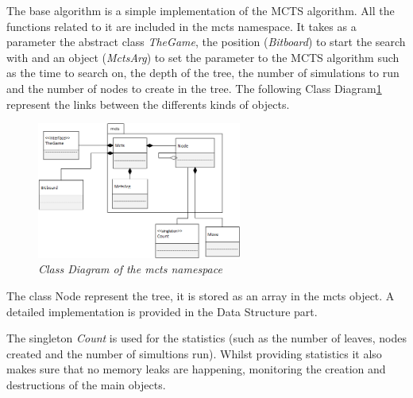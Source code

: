 The base algorithm is a simple implementation of the MCTS algorithm. All the functions related to it are included in the mcts namespace. It takes as a parameter the abstract class \textit{TheGame}, the position (\textit{Bitboard}) to start the search with and an object (\textit{MctsArg}) to set the parameter to the MCTS algorithm such as the time to search on, the depth of the tree, the number of simulations to run and the number of nodes to create in the tree.
The following Class Diagram\ref{fig:MCTSClassDiagram} represent the links between the differents kinds of objects.
\begin{figure}[H] 
\centerline{\includegraphics[width=0.6\textwidth]{Base_Algorithm/Img/MCTSsimple.png}}
\caption{\label{fig:MCTSClassDiagram}\textit{Class Diagram of the mcts namespace}}
\end{figure}
The class Node represent the tree, it is stored as an array in the mcts object. A detailed implementation is provided in the Data Structure part.

The singleton \textit{Count} is used for the statistics (such as the number of leaves, nodes created and the number of simultions run). Whilst providing statistics it also makes sure that no  memory leaks are happening, monitoring the creation and destructions of the main objects.

